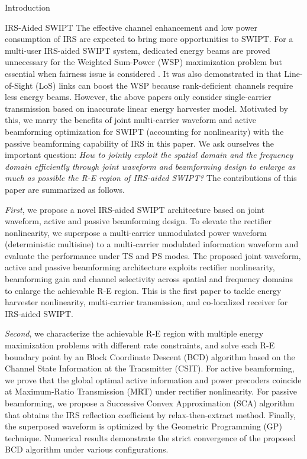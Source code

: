 \documentclass[journal]{IEEEtran}
\begin{document}
\begin{section}{Introduction}
		\begin{subsection}{IRS-Aided SWIPT}
			The effective channel enhancement and low power consumption of IRS are expected to bring more opportunities to SWIPT. For a multi-user IRS-aided SWIPT system, dedicated energy beams are proved unnecessary for the Weighted Sum-Power (WSP) maximization problem \cite{Wu2020b} but essential when fairness issue is considered \cite{Tang2019}. It was also demonstrated in \cite{Wu2020a} that Line-of-Sight (LoS) links can boost the WSP because rank-deficient channels require less energy beams. However, the above papers only consider single-carrier transmission based on inaccurate linear energy harvester model. Motivated by this, we marry the benefits of joint multi-carrier waveform and active beamforming optimization for SWIPT (accounting for nonlinearity) with the passive beamforming capability of IRS in this paper. We ask ourselves the important question: \emph{How to jointly exploit the spatial domain and the frequency domain efficiently through joint waveform and beamforming design to enlarge as much as possible the R-E region of IRS-aided SWIPT?} The contributions of this paper are summarized as follows.


			\emph{First}, we propose a novel IRS-aided SWIPT architecture based on joint waveform, active and passive beamforming design. To elevate the rectifier nonlinearity, we superpose a multi-carrier unmodulated power waveform (deterministic multisine) to a multi-carrier modulated information waveform and evaluate the performance under TS and PS modes. The proposed joint waveform, active and passive beamforming architecture exploits rectifier nonlinearity, beamforming gain and channel selectivity across spatial and frequency domains to enlarge the achievable R-E region. This is the first paper to tackle energy harvester nonlinearity, multi-carrier transmission, and co-localized receiver for IRS-aided SWIPT.

			\emph{Second}, we characterize the achievable R-E region with multiple energy maximization problems with different rate constraints, and solve each R-E boundary point by an Block Coordinate Descent (BCD) algorithm based on the Channel State Information at the Transmitter (CSIT). For active beamforming, we prove that the global optimal active information and power precoders coincide at Maximum-Ratio Transmission (MRT) under rectifier nonlinearity. For passive beamforming, we propose a Successive Convex Approximation (SCA) algorithm that obtains the IRS reflection coefficient by relax-then-extract method. Finally, the superposed waveform is optimized by the Geometric Programming (GP) technique. Numerical results demonstrate the strict convergence of the proposed BCD algorithm under various configurations.


\end{subsection}
\end{section}
\end{document}
